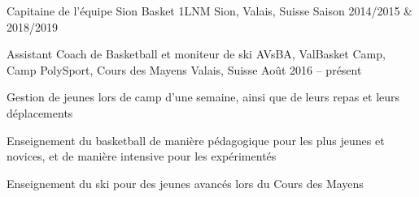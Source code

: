 

\begin{cventries}

  \cventry
    {Capitaine de l'équipe} %
    {Sion Basket 1LNM} %
    {Sion, Valais, Suisse} %
    {Saison 2014/2015 \& 2018/2019} %
    {}

\cventry
    {Assistant Coach de Basketball et moniteur de ski} %
    {AVsBA, ValBasket Camp, Camp PolySport, Cours des Mayens} %
    {Valais, Suisse} %
    {Août 2016 -- présent} %
    {
      \begin{cvitems} %
        \item {Gestion de jeunes lors de camp d'une semaine, ainsi que de leurs repas et leurs déplacements}
        \item {Enseignement du basketball de manière pédagogique pour les plus jeunes et novices, et de manière intensive pour les expérimentés}
        \item{Enseignement du ski pour des jeunes avancés lors du Cours des Mayens}
      \end{cvitems}
    }
    
    

\end{cventries}
